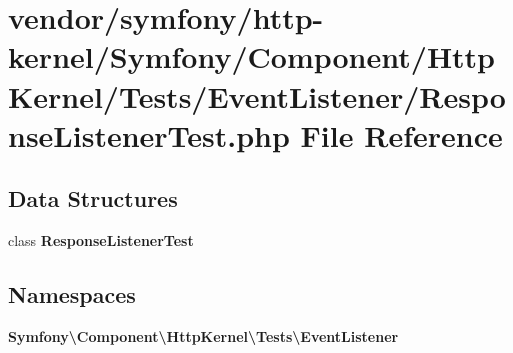 \section{vendor/symfony/http-\/kernel/\+Symfony/\+Component/\+Http\+Kernel/\+Tests/\+Event\+Listener/\+Response\+Listener\+Test.php File Reference}
\label{_response_listener_test_8php}
\subsection*{Data Structures}
\begin{DoxyCompactItemize}
\item 
class {\bf Response\+Listener\+Test}
\end{DoxyCompactItemize}
\subsection*{Namespaces}
\begin{DoxyCompactItemize}
\item 
 {\bf Symfony\textbackslash{}\+Component\textbackslash{}\+Http\+Kernel\textbackslash{}\+Tests\textbackslash{}\+Event\+Listener}
\end{DoxyCompactItemize}

